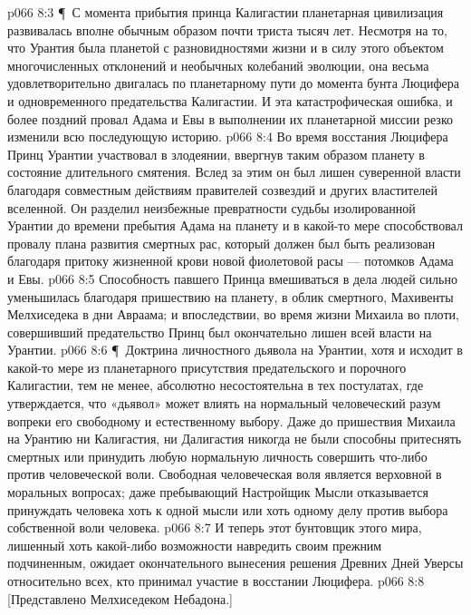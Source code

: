 \vs p066 8:3 \P\ С момента прибытия принца Калигастии планетарная цивилизация развивалась вполне обычным образом почти триста тысяч лет. Несмотря на то, что Урантия была планетой с разновидностями жизни и в силу этого объектом многочисленных отклонений и необычных колебаний эволюции, она весьма удовлетворительно двигалась по планетарному пути до момента бунта Люцифера и одновременного предательства Калигастии. И эта катастрофическая ошибка, и более поздний провал Адама и Евы в выполнении их планетарной миссии резко изменили всю последующую историю.
\vs p066 8:4 Во время восстания Люцифера Принц Урантии участвовал в злодеянии, ввергнув таким образом планету в состояние длительного смятения. Вслед за этим он был лишен суверенной власти благодаря совместным действиям правителей созвездий и других властителей вселенной. Он разделил неизбежные превратности судьбы изолированной Урантии до времени пребытия Адама на планету и в какой\hyp{}то мере способствовал провалу плана развития смертных рас, который должен был быть реализован благодаря притоку жизненной крови новой фиолетовой расы --- потомков Адама и Евы.
\vs p066 8:5 Способность павшего Принца вмешиваться в дела людей сильно уменьшилась благодаря пришествию на планету, в облик смертного, Махивенты Мелхиседека в дни Авраама; и впоследствии, во время жизни Михаила во плоти, совершивший предательство Принц был окончательно лишен всей власти на Урантии.
\vs p066 8:6 \P\ Доктрина личностного дьявола на Урантии, хотя и исходит в какой\hyp{}то мере из планетарного присутствия предательского и порочного Калигастии, тем не менее, абсолютно несостоятельна в тех постулатах, где утверждается, что «дьявол» может влиять на нормальный человеческий разум вопреки его свободному и естественному выбору. Даже до пришествия Михаила на Урантию ни Калигастия, ни Далигастия никогда не были способны притеснять смертных или принудить любую нормальную личность совершить что\hyp{}либо против человеческой воли. Свободная человеческая воля является верховной в моральных вопросах; даже пребывающий Настройщик Мысли отказывается принуждать человека хоть к одной мысли или хоть одному делу против выбора собственной воли человека.
\vs p066 8:7 И теперь этот бунтовщик этого мира, лишенный хоть какой\hyp{}либо возможности навредить своим прежним подчиненным, ожидает окончательного вынесения решения Древних Дней Уверсы относительно всех, кто принимал участие в восстании Люцифера.
\vs p066 8:8 [Представлено Мелхиседеком Небадона.]
